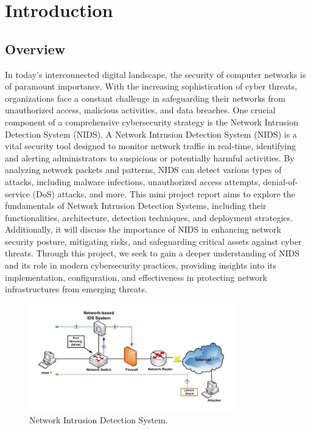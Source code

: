 \chapter{Introduction}
\section{Overview}
In today's interconnected digital landscape, the security of computer networks is of paramount
importance. With the increasing sophistication of cyber threats, organizations face a constant
challenge in safeguarding their networks from unauthorized access, malicious activities, and data
breaches. One crucial component of a comprehensive cybersecurity strategy is the Network
Intrusion Detection System (NIDS). A Network Intrusion Detection System (NIDS) is a vital
security tool designed to monitor network traffic in real-time, identifying and alerting administrators
to suspicious or potentially harmful activities. By analyzing network packets and patterns, NIDS
can detect various types of attacks, including malware infections, unauthorized access attempts,
denial-of-service (DoS) attacks, and more. This mini project report aims to explore the fundamentals
of Network Intrusion Detection Systems, including their functionalities, architecture, detection
techniques, and deployment strategies. Additionally, it will discuss the importance of NIDS in
enhancing network security posture, mitigating risks, and safeguarding critical assets against cyber
threats. Through this project, we seek to gain a deeper understanding of NIDS and its role in modern
cybersecurity practices, providing insights into its implementation, configuration, and effectiveness
in protecting network infrastructures from emerging threats.

\begin{figure}[ht]
    \centering
    \includegraphics[width=0.8\textwidth]{images/nids.png}
    \caption{Network Intrusion Detection System.}
    \label{fig:single}
\end{figure}

